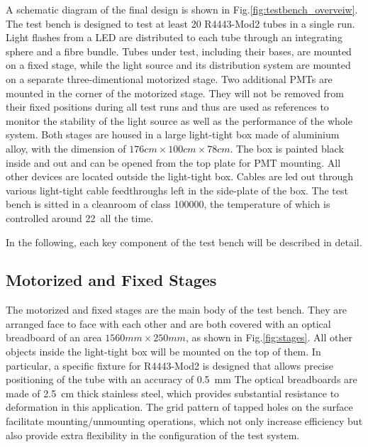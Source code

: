 \documentclass[5p, times]{elsarticle}
\begin{document}
A schematic diagram of the final design is shown in Fig.\ref{fig:testbench_overveiw}.
The test bench is designed to test at least 20 R4443-Mod2 tubes in a single run.
Light flashes from a LED are distributed to each tube through an integrating sphere and a fibre bundle.
Tubes under test, including their bases, are mounted on a fixed stage, while the light source and its distribution system are mounted on a separate three-dimentional motorized stage.
Two additional PMTs are mounted in the corner of the motorized stage.
They will not be removed from their fixed positions during all test runs and thus are used as references to monitor the stability of the light source as well as the performance of the whole system.
Both stages are housed in a large light-tight box made of aluminium alloy, with the dimension of $176cm\times100cm\times78cm$.
The box is painted black inside and out and can be opened from the top plate for PMT mounting.
All other devices are located outside the light-tight box.
Cables are led out through various light-tight cable feedthroughs left in the side-plate of the box.
The test bench is sitted in a cleanroom of class 100000, the temperature of which is controlled around 22\textcelsius~all the time.

In the following, each key component of the test bench will be described in detail.
\subsection{Motorized and Fixed Stages}
\label{sec:stages}

The motorized and fixed stages are the main body of the test bench.
They are arranged face to face with each other and are both covered with an optical breadboard of an area $1560mm\times250mm$, as shown in Fig.\ref{fig:stages}.
All other objects inside the light-tight box will be mounted on the top of them.
In particular, a specific fixture for R4443-Mod2 is designed that allows precise positioning of the tube with an accuracy of \textpm\SI{0.5}{\milli\meter}
The optical breadboards are made of \SI{2.5}{cm} thick stainless steel, which provides substantial resistance to deformation in this application.
The grid pattern of tapped holes on the surface facilitate mounting/unmounting operations, which not only increase efficiency but also provide extra flexibility in the configuration of the test system.
\end{document}
